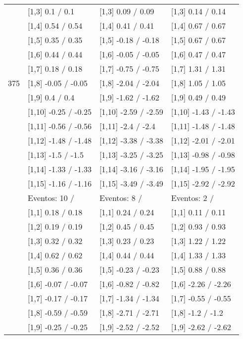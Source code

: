 \begin{table}
\begin{tabular}[t]{llll}
 & {}[1,3] 0.1  / 0.1 & {}[1,3] 0.09  / 0.09 & {}[1,3] 0.14  / 0.14\\
\addlinespace
 & {}[1,4] 0.54  / 0.54 & {}[1,4] 0.41  / 0.41 & {}[1,4] 0.67  / 0.67\\
 & {}[1,5] 0.35  / 0.35 & {}[1,5] -0.18  / -0.18 & {}[1,5] 0.67  / 0.67\\
 & {}[1,6] 0.44  / 0.44 & {}[1,6] -0.05  / -0.05 & {}[1,6] 0.47  / 0.47\\
 & {}[1,7] 0.18  / 0.18 & {}[1,7] -0.75  / -0.75 & {}[1,7] 1.31  / 1.31\\
375 & {}[1,8] -0.05  / -0.05 & {}[1,8] -2.04  / -2.04 & {}[1,8] 1.05  / 1.05\\
\addlinespace
 & {}[1,9] 0.4  / 0.4 & {}[1,9] -1.62  / -1.62 & {}[1,9] 0.49  / 0.49\\
 & {}[1,10] -0.25  / -0.25 & {}[1,10] -2.59  / -2.59 & {}[1,10] -1.43  / -1.43\\
 & {}[1,11] -0.56  / -0.56 & {}[1,11] -2.4  / -2.4 & {}[1,11] -1.48  / -1.48\\
 & {}[1,12] -1.48  / -1.48 & {}[1,12] -3.38  / -3.38 & {}[1,12] -2.01  / -2.01\\
 & {}[1,13] -1.5  / -1.5 & {}[1,13] -3.25  / -3.25 & {}[1,13] -0.98  / -0.98\\
\addlinespace
 & {}[1,14] -1.33  / -1.33 & {}[1,14] -3.16  / -3.16 & {}[1,14] -1.95  / -1.95\\
 & {}[1,15] -1.16  / -1.16 & {}[1,15] -3.49  / -3.49 & {}[1,15] -2.92  / -2.92\\
 & Eventos:  10 / & Eventos:  8 / & Eventos:  2 /\\
 & {}[1,1] 0.18  / 0.18 & {}[1,1] 0.24  / 0.24 & {}[1,1] 0.11  / 0.11\\
 & {}[1,2] 0.19  / 0.19 & {}[1,2] 0.45  / 0.45 & {}[1,2] 0.93  / 0.93\\
\addlinespace
 & {}[1,3] 0.32  / 0.32 & {}[1,3] 0.23  / 0.23 & {}[1,3] 1.22  / 1.22\\
 & {}[1,4] 0.62  / 0.62 & {}[1,4] 0.44  / 0.44 & {}[1,4] 1.33  / 1.33\\
 & {}[1,5] 0.36  / 0.36 & {}[1,5] -0.23  / -0.23 & {}[1,5] 0.88  / 0.88\\
 & {}[1,6] -0.07  / -0.07 & {}[1,6] -0.82  / -0.82 & {}[1,6] -2.26  / -2.26\\
 & {}[1,7] -0.17  / -0.17 & {}[1,7] -1.34  / -1.34 & {}[1,7] -0.55  / -0.55\\
\addlinespace
500 & {}[1,8] -0.59  / -0.59 & {}[1,8] -2.71  / -2.71 & {}[1,8] -1.2  / -1.2\\
 & {}[1,9] -0.25  / -0.25 & {}[1,9] -2.52  / -2.52 & {}[1,9] -2.62  / -2.62\\

\end{tabular}
\end{table}
